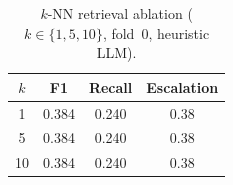 \begin{table}[!t]
\centering
\caption{$k$-NN retrieval ablation ($k \in \{1,5,10\}$, fold~0, heuristic LLM).}
\label{tab:knnk}
\begin{tabular}{cccc}
\toprule
$k$ & F1 & Recall & Escalation \\
\midrule
1 & 0.384 & 0.240 & 0.38 \\
5 & 0.384 & 0.240 & 0.38 \\
10 & 0.384 & 0.240 & 0.38 \\
\bottomrule
\end{tabular}
\end{table}
